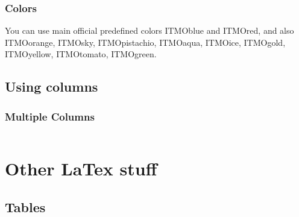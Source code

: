 \documentclass[aspectratio=169]{beamer}
\begin{document}
\begin{frame}
\frametitle{Colors}

You can use main official predefined colors 
\textcolor{ITMOblue}{ITMOblue} and \textcolor{ITMOred}{ITMOred}, and also
 \textcolor{ITMOorange}{ITMOorange}, \textcolor{ITMOsky}{ITMOsky}, \textcolor{ITMOpistachio}{ITMOpistachio}, \textcolor{ITMOaqua}{ITMOaqua}, \textcolor{ITMOice}{ITMOice}, \textcolor{ITMOgold}{ITMOgold}, \textcolor{ITMOyellow}{ITMOyellow}, \textcolor{ITMOtomato}{ITMOtomato}, \textcolor{ITMOgreen}{ITMOgreen}.

\end{frame}



\subsection{Using columns}


\begin{frame}
\frametitle{Multiple Columns}
\begin{columns}[c] 



\end{columns}
\end{frame}



\section{Other LaTex stuff}

\subsection{Tables}
\end{document}
